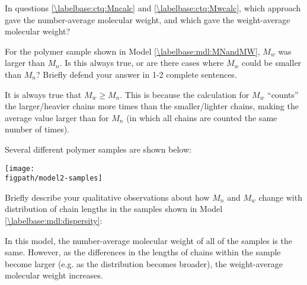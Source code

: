 \begin{activity}
\begin{ctqs}
	\question In questions \ref{\labelbase:ctq:Mncalc} and \ref{\labelbase:ctq:Mwcalc}, which approach gave the number-average molecular weight, and which gave the weight-average molecular weight?
	
		\begin{solution}[1.5in]\end{solution}
	
	\question For the polymer sample shown in Model \ref{\labelbase:mdl:MNandMW}, $M_w$ was larger than $M_n$.  Is this always true, or are there cases where $M_w$ could be smaller than $M_n$?  Briefly defend your answer in 1-2 complete sentences.
	
		\label{\labelbase:ctq:MWvsMN}
		
		\begin{solution}[2in]
		
			It is always true that $M_w \geq M_n$.  This is because the calculation for $M_w$ ``counts'' the larger/heavier chains more times than the smaller/lighter chains, making the average value larger than for $M_n$ (in which all chains are counted the same number of times).
			
		\end{solution}
	
		
\end{ctqs}

\begin{model}
\label{\labelbase:mdl:dispersity}

	Several different polymer samples are shown below:
	
	\vspace{6pt}
	\centerline{\texttt{[image: \\figpath/model2-samples]}}

\end{model}
	
\begin{ctqs}

	\question Briefly describe your qualitative observations about how $M_n$ and $M_w$ change with distribution of chain lengths in the samples shown in Model \ref{\labelbase:mdl:dispersity}:
	
		\begin{solution}[2in]
			In this model, the number-average molecular weight of all of the samples is the same.  However, as the differences in the lengths of chains within the sample become larger (e.g. as the distribution becomes broader), the weight-average molecular weight increases.
		\end{solution}
	

\end{ctqs}
\end{activity}
